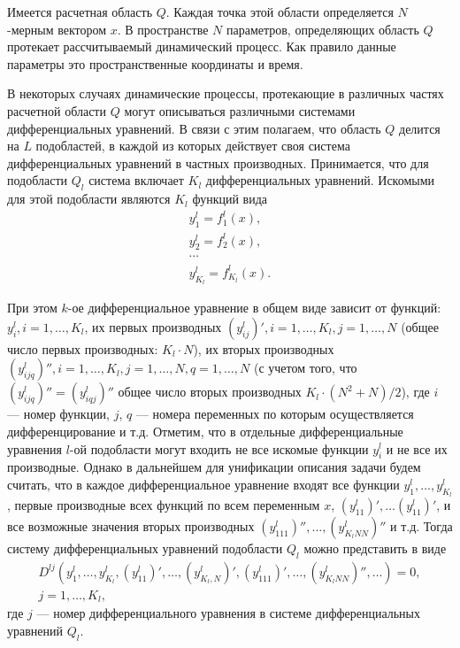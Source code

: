 \documentclass[a4paper,11pt,numreferences,mathsec,kaplist]{isuepsutf8}
\begin{document}
\begin{article}
Имеется расчетная область $Q$. Каждая точка этой области определяется
$N$-мерным вектором $x$. В пространстве $N$ параметров, определяющих
область $Q$ протекает рассчитываемый динамический процесс. Как правило
данные параметры это пространственные координаты и время.

В некоторых случаях динамические процессы, протекающие в различных частях
расчетной области $Q$ могут описываться различными системами
дифференциальных уравнений. В связи с этим полагаем, что область $Q$
делится на $L$ подобластей, в каждой из которых действует своя система
дифференциальных уравнений в частных производных. Принимается, что для
подобласти $Q_l$ система включает $K_l$ дифференциальных уравнений.
Искомыми для этой подобласти являются $K_l$ функций вида
\begin{equation} 
    \begin{array}{cc} 
        y^l_1=f^l_1(x), \\ 
        y^l_2=f^l_2(x), \\
        \cdots \\ 
        y^l_{K_l}=f^l_{K_l}(x).  
    \end{array} 
    \label{desir-fnc}
\end{equation}

При этом $k$-ое дифференциальное уравнение в общем виде зависит от функций:
$y^l_i, i = 1,\ldots,K_l$, их первых производных $(y^l_{ij})', i =
1,\ldots,K_l, j = 1, \ldots, N$ (общее число первых производных: $K_l \cdot
N$), их вторых производных $(y^l_{ijq})'', i = 1,\ldots,K_l, j =
1,\ldots,N, q = 1,\ldots,N$ (с учетом того, что $(y^l_{ijq})'' =
(y^l_{iqj})''$ общее число вторых производных $K_l \cdot (N^2+N) / 2$),
где $i$ --- номер функции, $j$, $q$ --- номера переменных по которым
осуществляется дифференцирование и т.д. Отметим, что в отдельные 
дифференциальные уравнения $l$-ой подобласти могут входить не все
искомые функции $y^l_i$ и не все их производные.  Однако в дальнейшем
для унификации описания задачи будем считать, что в каждое
дифференциальное уравнение входят все функции
$y^l_1,\ldots,y^l_{K_l}$, первые производные всех функций по всем
переменным $x$, $(y^l_{11})', \ldots (y^l_{11})'$, и все возможные
значения вторых производных $(y^l_{111})'', \ldots, (y^l_{K_lNN})''$ и
т.д. Тогда систему дифференциальных уравнений подобласти $Q_l$ можно
представить в виде
\begin{equation}
    \begin{array}{cc}
    D^{lj}(y^l_1,\ldots,y^l_{K_l}, (y^l_{11})',\ldots, (y^l_{K_l,N})',
        (y^l_{111})',\ldots, (y^l_{K_lNN})'',\ldots) = 0,\\ 
        j = 1, \ldots, K_l,
    \end{array}
    \label{pde}
\end{equation}
где $j$ --- номер дифференциального уравнения в 
системе дифференциальных уравнений $Q_l$.


\end{article}
\end{document}
